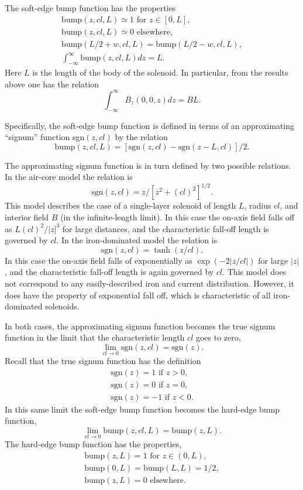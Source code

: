 The soft-edge bump function has the properties
\[
\begin{array}{c}
\mbox{bump}(z,cl,L) \simeq 1 \mbox{ for } z \in [0,L], \\
\mbox{bump}(z,cl,L) \simeq 0 \mbox{ elsewhere},\\
\mbox{bump}(L/2 + w,cl,L) = \mbox{bump}(L/2 - w,cl,L), \\
\int_{-\infty}^{\infty}\mbox{bump}(z,cl,L) dz = L.
\end{array}   \]
Here $L$ is the length of the body of the solenoid.  In particular, from the results above one has the relation
\[  \int_{-\infty}^{\infty}B_z(0,0,z) dz = BL.  \]

Specifically, the soft-edge bump function is defined in terms of an approximating ``signum'' function sgn$(z,cl)$ by the relation
\[  \mbox{bump}(z,cl,L) = [\mbox{sgn}(z,cl) - \mbox{sgn}(z-L,cl)]/2.  \]

The approximating signum function is in turn defined by two possible relations.  In the air-core model the relation is
\[  \mbox{sgn}(z,cl) = z/[z^2+(cl)^2]^{1/2}.   \]
This model describes the case of a single-layer solenoid of length $L$, radius $cl$, and interior field $B$ (in the infinite-length limit). In this case the on-axis field falls off as $L(cl)^2/|z|^3$ for large distances, and the characteristic fall-off length is governed by $cl$. In the iron-dominated model the relation is
\[  \mbox{sgn}(z,cl) = \tanh(z/cl).   \]
In this case the on-axis field falls of exponentially as $\exp(-2|z/cl|)$ for large $|z|$, and the characteristic fall-off length is again governed by $cl$. This model does not correspond to any easily-described iron and current distribution.  However, it does have the property of exponential fall off, which is characteristic of all iron-dominated solenoids.

In both cases, the approximating signum function becomes the true signum function in the limit that the characteristic length $cl$ goes to zero,
\[ \lim_{cl \rightarrow 0} \mbox{sgn}(z,cl) = \mbox{sgn}(z).   \]
Recall that the true signum function has the definition
\[ \begin{array}{c}
\mbox{sgn}(z) = 1 \mbox{ if } z > 0,\\
\mbox{sgn}(z) = 0 \mbox{ if } z = 0,\\
\mbox{sgn}(z) = -1 \mbox{ if } z < 0.
\end{array}  \]
In this same limit the soft-edge bump function becomes the hard-edge bump function,
\[  \lim_{cl \rightarrow 0} \mbox{bump}(z,cl,L) = \mbox{bump}(z,L).  \]
The hard-edge bump function has the properties,
\[
\begin{array}{c}
\mbox{bump}(z,L) = 1 \mbox{ for }  z \in (0,L),\\
\mbox{bump}(0,L) = \mbox{bump}(L,L) = 1/2,\\
\mbox{bump}(z,L) = 0 \mbox{ elsewhere}.
\end{array}    \]


